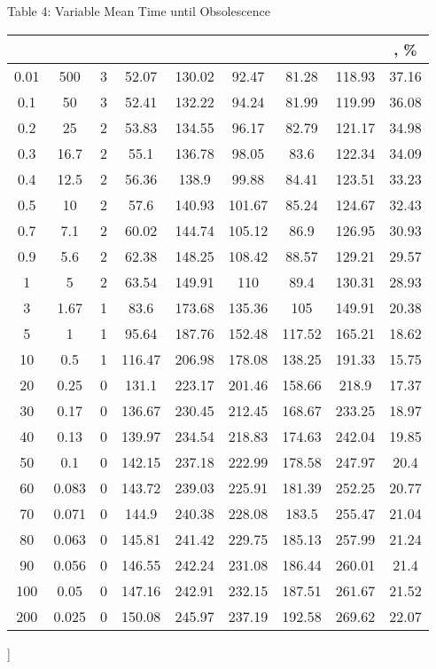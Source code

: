 \documentclass[11pt]{article}
\begin{document}
\newpage
\begin{center}
Table 4: Variable Mean Time until Obsolescence
\\ \vspace{2mm}
\begin{tabular}{|c|c|c|c|c|c|c|c|c|}
  \hline
&   &    &  &    &    & & & , \%\\
\hline 0.01 & 500 & 3 & 52.07 & 130.02 & 92.47 & 81.28 & 118.93 &
37.16 \\
0.1&    50& 3&  52.41&  132.22& 94.24&  81.99&  119.99& 36.08\\
0.2&    25& 2&  53.83&  134.55& 96.17&  82.79&  121.17& 34.98\\
0.3&    16.7&   2&  55.1&   136.78& 98.05&  83.6&   122.34& 34.09\\
0.4&    12.5&   2&  56.36&  138.9&  99.88&  84.41&  123.51& 33.23\\
0.5&    10& 2&  57.6&   140.93& 101.67& 85.24&  124.67& 32.43\\
0.7&    7.1&    2&  60.02&  144.74& 105.12& 86.9&   126.95& 30.93\\
0.9&    5.6&    2&  62.38&  148.25& 108.42& 88.57&  129.21& 29.57\\
1&  5&  2&  63.54&  149.91& 110&    89.4&   130.31& 28.93\\
3&  1.67&   1&  83.6&   173.68& 135.36& 105&    149.91& 20.38\\
5&  1&  1&  95.64&  187.76& 152.48& 117.52& 165.21& 18.62\\
10& 0.5&    1&  116.47& 206.98& 178.08& 138.25& 191.33& 15.75\\
20& 0.25&   0&  131.1&  223.17& 201.46& 158.66& 218.9&  17.37\\
30& 0.17&   0&  136.67& 230.45& 212.45& 168.67& 233.25& 18.97\\
40& 0.13&   0&  139.97& 234.54& 218.83& 174.63& 242.04& 19.85\\
50& 0.1&    0&  142.15& 237.18& 222.99& 178.58& 247.97& 20.4\\
60& 0.083&  0&  143.72& 239.03& 225.91& 181.39& 252.25& 20.77\\
70& 0.071&  0&  144.9&  240.38& 228.08& 183.5&  255.47& 21.04\\
80& 0.063&  0&  145.81& 241.42& 229.75& 185.13& 257.99& 21.24\\
90& 0.056&  0&  146.55& 242.24& 231.08& 186.44& 260.01& 21.4\\
100&    0.05&   0&  147.16& 242.91& 232.15& 187.51& 261.67& 21.52\\
200&    0.025&  0&  150.08& 245.97& 237.19& 192.58& 269.62& 22.07\\
\hline
\end{tabular}
\end{center}]
\end{document}
